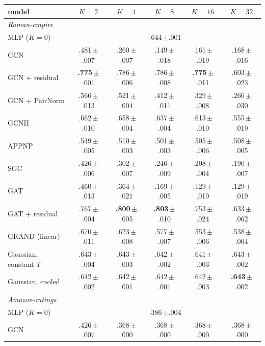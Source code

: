 \begin{tabular}{lccccc}
\toprule
model & $K=2$ & $K=4$ & $K=8$ & $K=16$ & $K=32$\\
\midrule
\multicolumn{6}{l}{\emph{Roman-empire}}\\
MLP ($K=0$) & \multicolumn{5}{c}{.644\,{\tiny$\pm$.001}}\\
GCN & .481\,{\tiny$\pm$.007} & .260\,{\tiny$\pm$.007} & .149\,{\tiny$\pm$.018} & .161\,{\tiny$\pm$.019} & .168\,{\tiny$\pm$.016}\\
GCN + residual & \textbf{.775}\,{\tiny$\pm$.001} & .786\,{\tiny$\pm$.006} & .786\,{\tiny$\pm$.008} & \textbf{.775}\,{\tiny$\pm$.011} & .603\,{\tiny$\pm$.023}\\
GCN + PairNorm & .566\,{\tiny$\pm$.013} & .521\,{\tiny$\pm$.004} & .412\,{\tiny$\pm$.011} & .329\,{\tiny$\pm$.008} & .266\,{\tiny$\pm$.030}\\
GCNII & .662\,{\tiny$\pm$.010} & .658\,{\tiny$\pm$.004} & .637\,{\tiny$\pm$.004} & .613\,{\tiny$\pm$.010} & .555\,{\tiny$\pm$.019}\\
APPNP & .549\,{\tiny$\pm$.005} & .510\,{\tiny$\pm$.003} & .501\,{\tiny$\pm$.003} & .505\,{\tiny$\pm$.006} & .508\,{\tiny$\pm$.005}\\
SGC & .426\,{\tiny$\pm$.006} & .302\,{\tiny$\pm$.007} & .246\,{\tiny$\pm$.009} & .208\,{\tiny$\pm$.004} & .190\,{\tiny$\pm$.007}\\
GAT & .460\,{\tiny$\pm$.013} & .364\,{\tiny$\pm$.021} & .169\,{\tiny$\pm$.005} & .129\,{\tiny$\pm$.019} & .129\,{\tiny$\pm$.019}\\
GAT + residual & .767\,{\tiny$\pm$.004} & \textbf{.800}\,{\tiny$\pm$.005} & \textbf{.803}\,{\tiny$\pm$.010} & .753\,{\tiny$\pm$.024} & .633\,{\tiny$\pm$.062}\\
GRAND (linear) & .670\,{\tiny$\pm$.011} & .623\,{\tiny$\pm$.008} & .577\,{\tiny$\pm$.007} & .553\,{\tiny$\pm$.006} & .538\,{\tiny$\pm$.004}\\
Gaussian, constant $T$ & .643\,{\tiny$\pm$.004} & .643\,{\tiny$\pm$.003} & .642\,{\tiny$\pm$.002} & .641\,{\tiny$\pm$.003} & .643\,{\tiny$\pm$.002}\\
Gaussian, cooled & .642\,{\tiny$\pm$.002} & .642\,{\tiny$\pm$.001} & .642\,{\tiny$\pm$.001} & .642\,{\tiny$\pm$.003} & \textbf{.643}\,{\tiny$\pm$.002}\\
\midrule
\multicolumn{6}{l}{\emph{Amazon-ratings}}\\
MLP ($K=0$) & \multicolumn{5}{c}{.386\,{\tiny$\pm$.004}}\\
GCN & .426\,{\tiny$\pm$.007} & .368\,{\tiny$\pm$.000} & .368\,{\tiny$\pm$.000} & .368\,{\tiny$\pm$.000} & .368\,{\tiny$\pm$.000}\\

\end{tabular}

